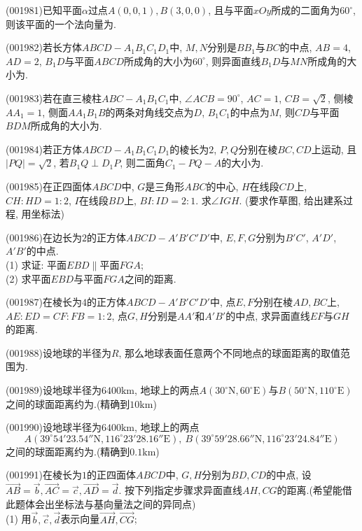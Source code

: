\item (001981)已知平面$\alpha$过点$A(0,0,1),B(3,0,0)$, 且与平面$xOy$所成的二面角为$60^\circ$, 则该平面的一个法向量为.
\item (001982)若长方体$ABCD-A_1B_1C_1D_1$中, $M,N$分别是$BB_1$与$BC$的中点, $AB=4$, $AD=2$, $B_1D$与平面$ABCD$所成角的大小为$60^\circ$, 则异面直线$B_1D$与$MN$所成角的大小为.
\item (001983)若在直三棱柱$ABC-A_1B_1C_1$中, $\angle ACB=90^\circ$, $AC=1$, $CB=\sqrt{2}$, 侧棱$AA_1=1$, 侧面$AA_1B_1B$的两条对角线交点为$D$, $B_1C_1$的中点为$M$, 则$CD$与平面$BDM$所成角的大小为.
\item (001984)若正方体$ABCD-A_1B_1C_1D_1$的棱长为$2$, $P,Q$分别在棱$BC,CD$上运动, 且$|PQ|=\sqrt{2}$, 若$B_1Q\perp D_1P$, 则二面角$C_1-PQ-A$的大小为.
\item (001985)在正四面体$ABCD$中, $G$是三角形$ABC$的中心, $H$在线段$CD$上, $CH:HD=1:2$, $I$在线段$BD$上, $BI:ID=2:1$. 求$\angle IGH$. (要求作草图, 给出建系过程, 用坐标法)
\item (001986)在边长为$2$的正方体$ABCD-A'B'C'D'$中, $E,F,G$分别为$B'C'$, $A'D'$, $A'B'$的中点.\\ 
(1) 求证: 平面$EBD\parallel$平面$FGA$;\\ 
(2) 求平面$EBD$与平面$FGA$之间的距离.
\item (001987)在棱长为$4$的正方体$ABCD-A'B'C'D'$中, 点$E,F$分别在棱$AD,BC$上, $AE:ED=CF:FB=1:2$, 点$G,H$分别是$AA'$和$A'B'$的中点, 求异面直线$EF$与$GH$的距离.
\item (001988)设地球的半径为$R$, 那么地球表面任意两个不同地点的球面距离的取值范围为.
\item (001989)设地球半径为$6400\mathrm{km}$, 地球上的两点$A(30^\circ\mathrm{N}, 60^\circ\mathrm{E})$与$B(50^\circ\mathrm{N}, 110^\circ\mathrm{E})$之间的球面距离约为.(精确到$10\mathrm{km}$)
\item (001990)设地球半径为$6400\mathrm{km}$, 地球上的两点$$A(39^\circ54'23.54''\mathrm{N}, 116^\circ23'28.16''\mathrm{E}), \ B(39^\circ59'28.66''\mathrm{N}, 116^\circ23'24.84''\mathrm{E})$$之间的球面距离约为.(精确到$0.1\mathrm{km}$)
\item (001991)在棱长为$1$的正四面体$ABCD$中, $G,H$分别为$BD,CD$的中点, 设$\overrightarrow{AB}=\overrightarrow{b}, \overrightarrow{AC}=\overrightarrow{c}, \overrightarrow{AD}=\overrightarrow{d}$. 按下列指定步骤求异面直线$AH, CG$的距离.(希望能借此题体会出坐标法与基向量法之间的异同点)\\ 
(1) 用$\overrightarrow{b},\overrightarrow{c},\overrightarrow{d}$表示向量$\overrightarrow{AH},\overrightarrow{CG}$;\\ 
